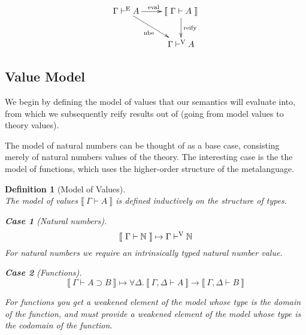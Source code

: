 \documentclass[preprint,nonatbib]{sigplanconf}
\newtheorem{defin}{Definition}
\newtheorem{subdefin}{Case}
\numberwithin{subdefin}{defin}
\theoremstyle{definition}
\numberwithin{subtheorem}{theorem}
\numberwithin{sublemma}{theorem}
\numberwithin{corollary}{theorem}
\numberwithin{case}{theorem}
\numberwithin{slcase}{sublemma}
\numberwithin{scase}{subtheorem}
\numberwithin{lcase}{lemma}
\newcommand{\refsec}[1]{Section \ref{sec:#1}}
\def\dfn{\mapsto}
\def\arr{\supset}
\def\marr{\rightarrow}
\def\nat{\mathbb{N}}
\newcommand{\turn}[1]{\vdash^\con{#1}}
\newcommand{\all}[1]{\forall#1.~}
\newcommand{\el}[1]{\llbracket ~ #1 ~ \rrbracket}
\newcommand{\con}[1]{\textmd{#1}}
\newcommand{\fun}[1]{\textmd{#1}}
\newcommand{\typm}[1]{\el{\Gamma \vdash #1}}
\newcommand{\gdtypm}[1]{\el{\Gamma, \Delta \vdash #1}}
\newcommand{\type}[1]{\Gamma \turn{E} #1}
\newcommand{\typv}[1]{\Gamma \turn{V} #1}
\begin{document}
\begin{displaymath}
    \xymatrix{
          {\type{A}} 
          \ar[dr]_{\fun{nbe}}
          \ar[r]^{\fun{eval}}
        & {\typm{A}}
          \ar[d]^{\large{\fun{reify}}}
\\      & \typv{A} }
\end{displaymath}



\subsection{Value Model}

We begin by defining the model of values that our semantics will
evaluate into, from which we subsequently reify results out of
(going from model values to theory values).

The model of natural numbers can be thought of as a base case,
consisting merely of natural numbers values of the theory. The
interesting case is the the model of functions, which uses the
higher-order structure of the metalanguage.

\begin{defin}[Model of Values]
\label{def:mval}
$ $\\
The model of values $\typm{A}$ is defined inductively on the structure
of types.

\begin{subdefin}[Natural numbers]
$$
\typm{\nat} \dfn \typv{\nat}
$$
For natural numbers we require an intrinsically typed natural number
value.
\end{subdefin}

\begin{subdefin}[Functions]
$$
\typm{A \arr B} \dfn \all{\Delta} \gdtypm{A} \marr \gdtypm{B}
$$

For functions you get a weakened element of the model whose type is
the domain of the function, and must provide a weakened element of the
model whose type is the codomain of the function.
\end{subdefin}

\end{defin}
\end{document}
